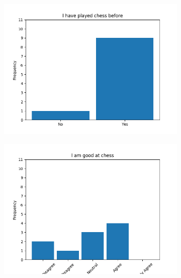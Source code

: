 \documentclass{article}
\begin{document}
\begin{figure}[!ht]
\centering
\begin{subfigure}{.5\textwidth}
    \centering
    \includegraphics[width=\textwidth]{images/questions/0}
\end{subfigure}%
\begin{subfigure}{.5\textwidth}
    \centering
    \includegraphics[width=\textwidth]{images/questions/1}
\end{subfigure}
\begin{subfigure}{.5\textwidth}
    \centering

\end{subfigure}
\end{figure}
\end{document}
